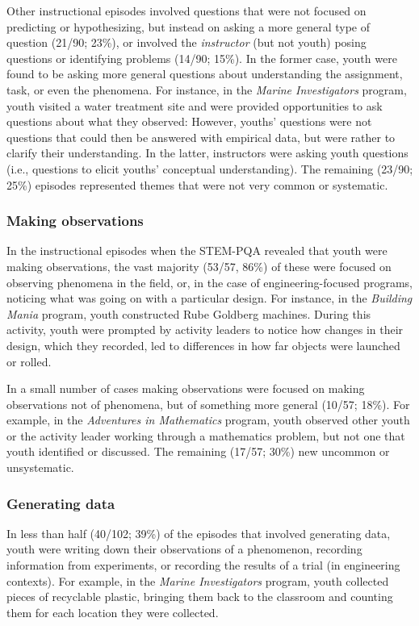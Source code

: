 \documentclass[]{book}
\theoremstyle{definition}
\theoremstyle{definition}
\theoremstyle{definition}
\theoremstyle{remark}
\begin{document}
Other instructional episodes involved questions that were not focused on
predicting or hypothesizing, but instead on asking a more general type
of question (21/90; 23\%), or involved the \emph{instructor} (but not
youth) posing questions or identifying problems (14/90; 15\%). In the
former case, youth were found to be asking more general questions about
understanding the assignment, task, or even the phenomena. For instance,
in the \emph{Marine Investigators} program, youth visited a water
treatment site and were provided opportunities to ask questions about
what they observed: However, youths' questions were not questions that
could then be answered with empirical data, but were rather to clarify
their understanding. In the latter, instructors were asking youth
questions (i.e., questions to elicit youths' conceptual understanding).
The remaining (23/90; 25\%) episodes represented themes that were not
very common or systematic.

\subsubsection{Making observations}\label{making-observations}

In the instructional episodes when the STEM-PQA revealed that youth were
making observations, the vast majority (53/57, 86\%) of these were
focused on observing phenomena in the field, or, in the case of
engineering-focused programs, noticing what was going on with a
particular design. For instance, in the \emph{Building Mania} program,
youth constructed Rube Goldberg machines. During this activity, youth
were prompted by activity leaders to notice how changes in their design,
which they recorded, led to differences in how far objects were launched
or rolled.

In a small number of cases making observations were focused on making
observations not of phenomena, but of something more general (10/57;
18\%). For example, in the \emph{Adventures in Mathematics} program,
youth observed other youth or the activity leader working through a
mathematics problem, but not one that youth identified or discussed. The
remaining (17/57; 30\%) new uncommon or unsystematic.

\subsubsection{Generating data}\label{generating-data}

In less than half (40/102; 39\%) of the episodes that involved
generating data, youth were writing down their observations of a
phenomenon, recording information from experiments, or recording the
results of a trial (in engineering contexts). For example, in the
\emph{Marine Investigators} program, youth collected pieces of
recyclable plastic, bringing them back to the classroom and counting
them for each location they were collected.
\end{document}
